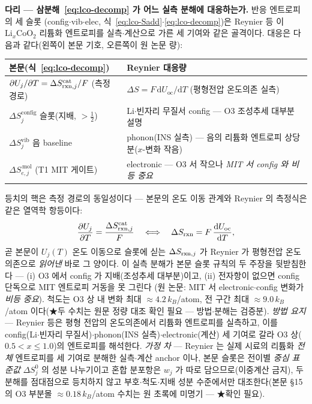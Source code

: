 \begin{srcbox}
\textbf{다리 --- 삼분해~\eqref{eq:lco-decomp} 가 어느 실측 분해에 대응하는가.} 반응 엔트로피의 세 슬롯
(config$\cdot$vib$\cdot$elec, 식~\eqref{eq:lco-Sadd}$\cdot$\eqref{eq:lco-decomp})은 Reynier
등\cite{reynier2004} 이 $\mathrm{Li}_x\mathrm{CoO_2}$ 리튬화 엔트로피를 실측$\cdot$계산으로 가른 세 기여와
같은 골격이다. 대응은 다음과 같다(왼쪽이 본문 기호, 오른쪽이 원 논문 량):
\begin{center}\footnotesize
\begin{tabular}{@{}ll@{}}
\hline
본문(식~\eqref{eq:lco-decomp}) & Reynier\cite{reynier2004} 대응량 \\
\hline
$\partial U_j/\partial T=\Delta S_{\mathrm{rxn},j}^\mathrm{cat}/F$ (측정 경로) & $\Delta S=F\,\mathrm dU_\mathrm{oc}/\mathrm dT$ (평형전압 온도의존 실측) \\
$\Delta S_j^\mathrm{config}$ 슬롯(지배, $>\tfrac12$) & Li$\cdot$빈자리 무질서 config --- O3 조성추세 대부분 설명 \\
$\Delta S_j^\mathrm{vib}$ 음 baseline & phonon(INS 실측) --- 음의 리튬화 엔트로피 상당분($x$-변화 작음) \\
$\Delta S_{e,j}^{\,\mathrm{mol}}$ (T1 MIT 게이트) & electronic --- O3 서 작으나 \emph{MIT 서 config 와 비등 중요} \\
\hline
\end{tabular}
\end{center}
등치의 핵은 측정 경로의 동일성이다 --- 본문의 온도 이동 관계와 Reynier 의 측정식은 같은 열역학
항등이다:
\begin{equation}
\frac{\partial U_j}{\partial T}=\frac{\Delta S_{\mathrm{rxn},j}^\mathrm{cat}}{F}
\quad\Longleftrightarrow\quad
\Delta S_{\mathrm{rxn}}=F\,\frac{\mathrm dU_\mathrm{oc}}{\mathrm dT},
\label{eq:br-reynier2004-1}
\end{equation}
곧 본문이 $U_j(T)$ 온도 이동으로 슬롯에 싣는 $\Delta S_{\mathrm{rxn},j}$ 가 Reynier 가 평형전압 온도의존으로
\emph{읽어낸} 바로 그 양이다. 이 실측 분해가 본문 슬롯 규칙의 두 주장을 뒷받침한다 --- (i) O3 에서
config 가 지배(조성추세 대부분)이고, (ii) 전자항이 없으면 config 단독으로 MIT 엔트로피 거동을 못 그린다
(원 논문: MIT 서 electronic$\cdot$config 변화가 \emph{비등 중요}). 척도는 O3 상 내 변화 최대
$\approx4.2\,k_B$/atom, 전 구간 최대 $\approx9.0\,k_B$/atom 이다(★두 수치는 원문 정량 대조 확인 필요 --- 방법$\cdot$분해는 검증분). \emph{방법 요지} --- Reynier 등은 평형
전압의 온도의존에서 리튬화 엔트로피를 실측하고, 이를 config(Li$\cdot$빈자리 무질서)$\cdot$phonon(INS
실측)$\cdot$electronic(계산) 세 기여로 갈라 O3 상($0.5{<}x{\le}1.0$)의 엔트로피를 해석한다. \emph{가정
차} --- Reynier 는 실제 시료의 리튬화 \emph{전체} 엔트로피를 세 기여로 분해한 실측$\cdot$계산 anchor 이나,
본문 슬롯은 전이별 \emph{중심 표준값} $\Delta S_j^0$ 의 성분 나누기이고 혼합 분포항은 $w_j$ 가 따로
담으므로(이중계산 금지), 두 분해를 점대점으로 등치하지 않고 부호$\cdot$척도$\cdot$지배 성분 수준에서만
대조한다(본문 §15 의 O3 부분몰 $\approx0.18\,k_B$/atom 수치는 원 초록에 미명기 --- ★확인 필요).
\end{srcbox}

